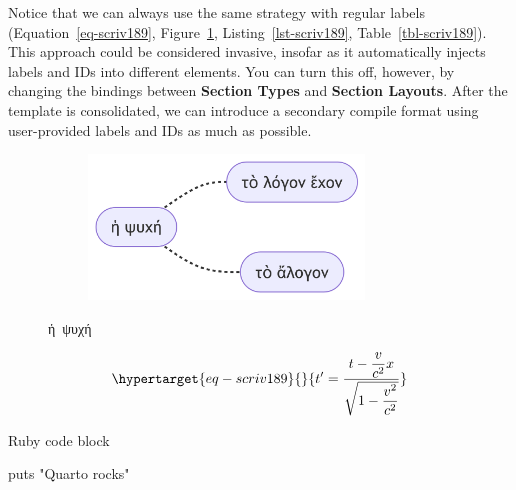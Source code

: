 \documentclass[
  12pt,
  a4paper,
  oneside,
  titlepage,
  toclink=all,
  toc=bibliography]{scrbook}
\newenvironment{Shaded}{\begin{snugshade}}{\end{snugshade}}
\newcommand{\FunctionTok}[1]{\textcolor[rgb]{0.28,0.35,0.67}{#1}}
\newcommand{\StringTok}[1]{\textcolor[rgb]{0.13,0.47,0.30}{#1}}
\theoremstyle{plain}
\theoremstyle{plain}
\theoremstyle{definition}
\theoremstyle{definition}
\theoremstyle{plain}
\theoremstyle{plain}
\theoremstyle{plain}
\theoremstyle{definition}
\theoremstyle{remark}
\begin{document}
\protect\hypertarget{scriv189}{}{}

Notice that we can always use the same strategy with regular labels
(\protect\hypertarget{cite_54}{}{\label{cite_54}Equation~\ref{eq-scriv189}},
\protect\hypertarget{cite_55}{}{\label{cite_55}Figure~\ref{fig-scriv189}},
\protect\hypertarget{cite_56}{}{\label{cite_56}Listing~\ref{lst-scriv189}},
\protect\hypertarget{cite_57}{}{\label{cite_57}Table~\ref{tbl-scriv189}}).
This approach could be considered invasive, insofar as it automatically
injects labels and IDs into different elements. You can turn this off,
however, by changing the bindings between \textbf{Section Types} and
\textbf{Section Layouts}. After the template is consolidated, we can
introduce a secondary compile format using user-provided labels and IDs
as much as possible.

\begin{figure}

{\centering 

\begin{figure}[H]

{\centering \includegraphics[width=2.89in,height=1.52in]{export_files/figure-latex/mermaid-figure-2.png}

}

\end{figure}

}

\caption{\label{fig-scriv189}ἡ~ψυχή}

\end{figure}

\begin{equation}\protect\hypertarget{eq-scriv189}{}{t' = \frac{t - \dfrac{v}{c^{2}}x}{\sqrt{1 - \dfrac{v^{2}}{c^{2}}}}}\label{eq-scriv189}\end{equation}

\begin{codelisting}

\caption{Ruby code block}

\hypertarget{lst-scriv189}{%
\label{lst-scriv189}}%
\begin{Shaded}
\begin{Highlighting}[numbers=left,,]
\FunctionTok{puts} \StringTok{"Quarto rocks"}
\end{Highlighting}
\end{Shaded}

\end{codelisting}
\end{document}
